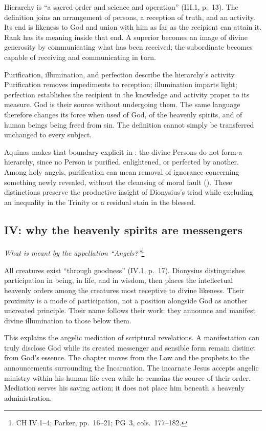 Hierarchy is ``a sacred order and science and operation'' (III.1, p.~13). The definition joins an arrangement of persons, a reception of truth, and an activity. Its end is likeness to God and union with him as far as the recipient can attain it. Rank has its meaning inside that end. A superior becomes an image of divine generosity by communicating what has been received; the subordinate becomes capable of receiving and communicating in turn.

Purification, illumination, and perfection describe the hierarchy's activity. Purification removes impediments to reception; illumination imparts light; perfection establishes the recipient in the knowledge and activity proper to its measure. God is their source without undergoing them. The same language therefore changes its force when used of God, of the heavenly spirits, and of human beings being freed from sin. The definition cannot simply be transferred unchanged to every subject.

Aquinas makes that boundary explicit in : the divine Persons do not form a hierarchy, since no Person is purified, enlightened, or perfected by another. Among holy angels, purification can mean removal of ignorance concerning something newly revealed, without the cleansing of moral fault (). These distinctions preserve the productive insight of Dionysius's triad while excluding an inequality in the Trinity or a residual stain in the blessed.

\subsection{IV: why the heavenly spirits are messengers}
\emph{What is meant by the appellation ``Angels?''}\footnote{CH IV.1--4; Parker, pp.~16--21; PG~3, cols.~177--182.}

All creatures exist ``through goodness'' (IV.1, p.~17). Dionysius distinguishes participation in being, in life, and in wisdom, then places the intellectual heavenly orders among the creatures most receptive to divine likeness. Their proximity is a mode of participation, not a position alongside God as another uncreated principle. Their name follows their work: they announce and manifest divine illumination to those below them.

This explains the angelic mediation of scriptural revelations. A manifestation can truly disclose God while its created messenger and sensible form remain distinct from God's essence. The chapter moves from the Law and the prophets to the announcements surrounding the Incarnation. The incarnate Jesus accepts angelic ministry within his human life even while he remains the source of their order. Mediation serves his saving action; it does not place him beneath a heavenly administration.


